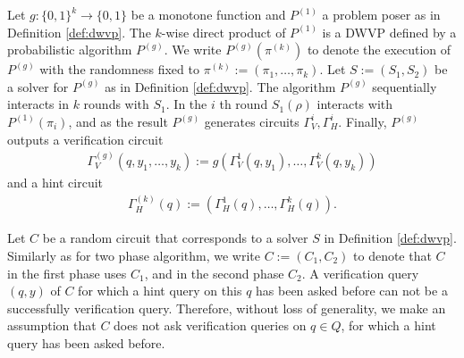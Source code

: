 \begin{definition}
Let $g: \{0,1\}^{k} \rightarrow \{0,1\}$ be a monotone function and $P^{(1)}$ a problem poser as in Definition \ref{def:dwvp}.
The $k$-wise direct product of $P^{(1)}$ is a DWVP defined by a probabilistic algorithm $P^{(g)}$.
We write $P^{(g)}(\pi^{(k)})$ to denote the execution of $P^{(g)}$ with the randomness fixed to $\pi^{(k)} := (\pi_1, \dots, \pi_k)$.
Let $S := (S_1, S_2)$ be a solver for $P^{(g)}$ as in Definition \ref{def:dwvp}.
The algorithm $P^{(g)}$ sequentially interacts in $k$ rounds with $S_1$.
In the $i$ th round $S_1(\rho)$ interacts with $P^{(1)}(\pi_i)$,
and as the result $P^{(g)}$ generates circuits $\Gamma_V^i, \Gamma_H^i$.
Finally, $P^{(g)}$ outputs a verification circuit
\begin{align*}
  \Gamma_V^{(g)} (q, y_1, \dots, y_k) := g(\Gamma_V^{1}(q, y_1), \dots, \Gamma_V^{k}(q, y_k))
\end{align*}
and a hint circuit
\begin{align*}
  \Gamma_H^{(k)} (q) := (\Gamma_H^{1}(q), \dots, \Gamma_H^{k}(q)).
\end{align*}
\end{definition}
%
Let $C$ be a random circuit that corresponds to a solver $S$ in Definition \ref{def:dwvp}.
Similarly as for two phase algorithm, we write $C := (C_1, C_2)$ to denote that $C$ in the first phase uses $C_1$,
and in the second phase $C_2$.
%
A verification query $(q,y)$ of $C$ for which a hint query on this $q$ has been asked before can not be a successfully verification query.
Therefore, without loss of generality, we make an assumption that $C$ does not ask verification queries on $q \in Q$,
for which a hint query has been asked before.
%
